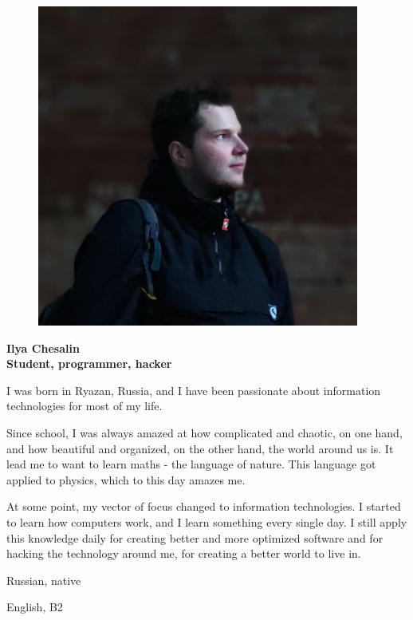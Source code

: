 \begin{figure}
	\hfill
	\includegraphics[width=0.6\columnwidth]{photo}
	\vspace{-7cm}
\end{figure}

\begin{flushright}\small

\end{flushright}\normalsize
\framebreak


\Huge\bfseries {{\color{Cyan} Ilya} {\color{Black} Chesalin}} \\
\Large\bfseries Student, programmer, hacker \\

\normalsize\normalfont

I was born in Ryazan, Russia, and I have been passionate about information
technologies for most of my life.

Since school, I was always amazed at how complicated and chaotic, on one hand, and how beautiful and organized, on the other hand, the world around us is. It lead me to want to learn maths - the language of nature. This language got applied to physics, which to this day amazes me.

At some point, my vector of focus changed to information technologies. I started to learn how computers work, and I learn something every single day. I still apply this knowledge daily for creating better and more optimized software and for hacking the technology around me, for creating a better world to live in.

\Sep


\begin{multicols}{3}
\begin{compactitem}[\color{Cyan}$\circ$]
    \item Russian, native
    \item English, B2
\end{compactitem}
\end{multicols}


